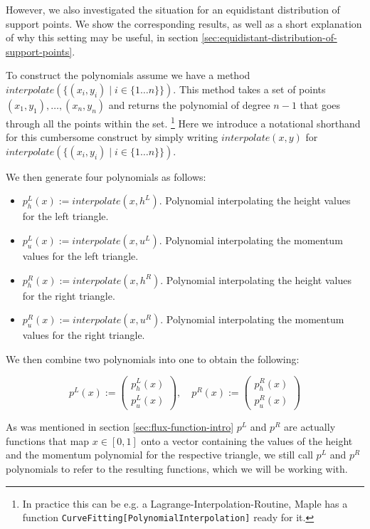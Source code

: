 \documentclass{article}
\begin{document}
However, we also investigated the situation for an equidistant distribution of support points. We show the corresponding results, as well as a short explanation of why this setting may be useful, in section \ref{sec:equidistant-distribution-of-support-points}.

To construct the polynomials assume we have a method $interpolate\left(\{\left(x_i,y_i\right) \mid i \in \{1 \dots n\}\}\right)$.
This method takes a set of points $\left(x_1,y_1\right),\dots,\left(x_n,y_n\right)$ and returns the polynomial of degree $n-1$ that goes through all the points within the set.
\footnote{In practice this can be e.g. a Lagrange-Interpolation-Routine, Maple has a function \texttt{CurveFitting[PolynomialInterpolation]} ready for it.}
Here we introduce a notational shorthand for this cumbersome construct by simply writing $interpolate\left(x,y\right)$ for $interpolate\left(\{\left(x_i,y_i\right) \mid i \in \{1 \dots n\}\}\right)$.

We then generate four polynomials as follows:

\begin{itemize}
\item $p^L_h(x) := interpolate (x,h^L)$. Polynomial interpolating the height values for the left triangle.
\item $p^L_u(x) := interpolate (x,u^L)$. Polynomial interpolating the momentum values for the left triangle.
\item $p^R_h(x) := interpolate (x,h^R)$. Polynomial interpolating the height values for the right triangle.
\item $p^R_u(x) := interpolate (x,u^R)$. Polynomial interpolating the momentum values for the right triangle.
\end{itemize}

We then combine two polynomials into one to obtain the following:

\begin{equation*}
  p^L(x) :=
  \begin{pmatrix}
    p^L_h(x) \\ p^L_u(x)
  \end{pmatrix}, \quad
  p^R(x) :=
  \begin{pmatrix}
    p^R_h(x) \\ p^R_u(x)
  \end{pmatrix}
\end{equation*}

As was mentioned in section \ref{sec:flux-function-intro} $p^L$ and $p^R$ are actually functions that map $x \in [0,1]$ onto a vector containing the values of the height and the momentum polynomial for the respective triangle, we still call $p^L$ and $p^R$ polynomials to refer to the resulting functions, which we will be working with.
\end{document}
